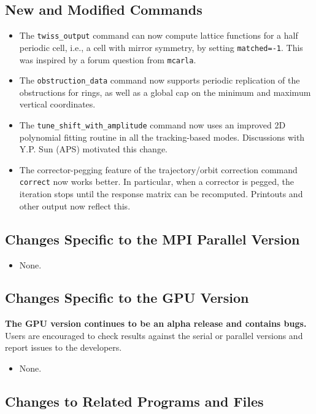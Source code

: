 \documentclass[11pt]{article}
\begin{document}
\subsection{New and Modified Commands}
\begin{itemize}
\item The \verb|twiss_output| command can now compute lattice functions for a half periodic cell, i.e., a 
  cell with mirror symmetry, by setting \verb|matched=-1|. This was inspired by a forum question from \verb|mcarla|.
\item The \verb|obstruction_data|  command now supports periodic replication of the obstructions for rings, as well
  as a global cap on the minimum and maximum vertical coordinates.
\item The \verb|tune_shift_with_amplitude| command now uses an improved 2D polynomial fitting routine in all the
  tracking-based modes. Discussions with Y.P. Sun (APS) motivated this change.
\item The corrector-pegging feature of the trajectory/orbit correction command \verb|correct| now works better.
  In particular, when a corrector is pegged, the iteration stops until the response matrix can be recomputed.
  Printouts and other output now reflect this.
\end{itemize}

\subsection{Changes Specific to the MPI Parallel Version}

\begin{itemize}
\item None.
\end{itemize}

\subsection{Changes Specific to the GPU Version}

{\bf The GPU version continues to be an alpha release and contains bugs.}  Users are encouraged to check results against
the serial or parallel versions and report issues to the developers.

\begin{itemize}
\item None.
\end{itemize}

\subsection{Changes to Related Programs and Files}
\end{document}

